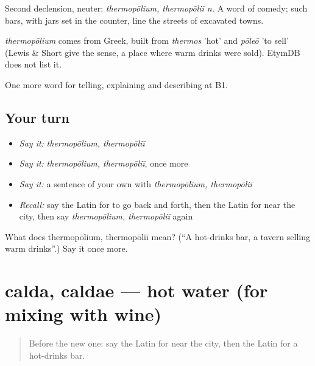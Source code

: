 Second declension, neuter: \emph{thermopōlium, thermopōliī n.} A word of comedy; such bars, with jars set in the counter, line the streets of excavated towns.

\begin{cousinweb}
\emph{thermopōlium} comes from Greek, built from \emph{thermos} 'hot' and \emph{pōleō} 'to sell' (Lewis \& Short give the sense, a place where warm drinks were sold). EtymDB does not list it.
\end{cousinweb}

\begin{grammarlens}[title={What you've built}]
One more word for telling, explaining and describing at B1.
\end{grammarlens}

\subsection*{Your turn}
\begin{itemize}
\raggedright
  \item \emph{Say it:} \emph{thermopōlium, thermopōliī}
  \item \emph{Say it:} \emph{thermopōlium, thermopōliī}, once more
  \item \emph{Say it:} a sentence of your own with \emph{thermopōlium, thermopōliī}
  \item \emph{Recall:} say the Latin for to go back and forth, then the Latin for near the city, then say \emph{thermopōlium, thermopōliī} again
\end{itemize}

\begin{tcolorbox}[breakable,colback=teal!4,colframe=teal!35!black,title={Before you move on}]
What does thermopōlium, thermopōliī mean? (\textquotedblleft{}A hot-drinks bar, a tavern selling warm drinks\textquotedblright{}.) Say it once more.
\end{tcolorbox}
\section[calda, caldae]{calda, caldae — hot water (for mixing with wine)}

\label{lesson:LA-C461-calda}



\begin{quote}
Before the new one: say the Latin for near the city, then the Latin for a hot-drinks bar.
\end{quote}

